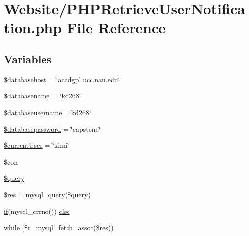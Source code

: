 \hypertarget{_p_h_p_retrieve_user_notification_8php}{\section{Website/\-P\-H\-P\-Retrieve\-User\-Notification.php File Reference}
\label{_p_h_p_retrieve_user_notification_8php}
}
\subsection*{Variables}
\begin{DoxyCompactItemize}
\item 
\hyperlink{_p_h_p_retrieve_user_notification_8php_a034ead57b6864a4413371711e8d65372}{\$databasehost} = \char`\"{}acadgpl.\-ucc.\-nau.\-edu\char`\"{}
\item 
\hyperlink{_p_h_p_retrieve_user_notification_8php_aace53f8afce81b52040cef0cd850138a}{\$databasename} = \char`\"{}kd268\char`\"{}
\item 
\hyperlink{_p_h_p_retrieve_user_notification_8php_a251bf75f510d7c8b556c65d7c30e911f}{\$databaseusername} =\char`\"{}kd268\char`\"{}
\item 
\hyperlink{_p_h_p_retrieve_user_notification_8php_a1a07536b6a5f43f2d8f826bd2ee6c91a}{\$databasepassword} = \char`\"{}capstone\char`\"{}
\item 
\hyperlink{_p_h_p_retrieve_user_notification_8php_a478a2fc0252b087f8bc01921fef09b78}{\$current\-User} = \char`\"{}kimi\char`\"{}
\item 
\hyperlink{_p_h_p_retrieve_user_notification_8php_a0debe10448ec56a57b5509648408a549}{\$con}
\item 
\hyperlink{_p_h_p_retrieve_user_notification_8php_af59a5f7cd609e592c41dc3643efd3c98}{\$query}
\item 
\hyperlink{_p_h_p_retrieve_user_notification_8php_a49a8a4009b02e49717caa88b128affc5}{\$res} = mysql\-\_\-query(\$query)
\item 
\hyperlink{_m_c_mhome_page_8php_a8dec719c1645067d1065f7f064d4b967}{if}(mysql\-\_\-errno()) \hyperlink{_p_h_p_retrieve_user_notification_8php_acd5fe7f2086f786c96623b819503b734}{else}
\item 
\hyperlink{_p_h_p_retrieve_user_notification_8php_a13a796604f93a68cd06c9010c6a6d0e5}{while} (\$r=mysql\-\_\-fetch\-\_\-assoc(\$res))
\end{DoxyCompactItemize}


